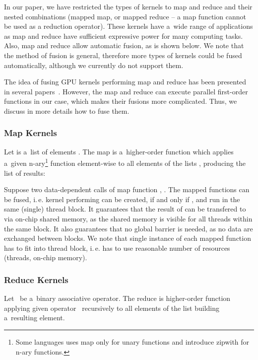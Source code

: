\documentclass[final]{siamltex}
\def\ie{i.\,e.}
\begin{document}
In our paper, we have restricted the types of kernels to map and reduce and their nested combinations (mapped map, or mapped reduce -- a map function cannot be used as a reduction operator). These kernels have a~wide range of applications as map and reduce have sufficient expressive power for many computing tasks. Also, map and reduce allow automatic fusion, as is shown below.
We note that the method of fusion is general, therefore more types of kernels could be fused automatically, although we currently do not support them. 

The idea of fusing GPU kernels performing map and reduce has been presented in several papers~\cite{sato2009skeletal, larsen2011simple, catanzaro2011copperhead, tarditi2006accelerator}. However, the map and reduce can execute parallel first-order functions in our case, which makes their fusions more complicated. Thus, we discuss in more details how to fuse them.

\subsubsection{Map Kernels}

Let  is a~list of  elements . The map is a~higher-order function which applies a~given n-ary\footnote{Some languages uses map only for unary functions and introduce zipwith for n-ary functions.} function  element-wise to all elements of the lists , producing the list of results:

\begin{center}
        
\end{center}

Suppose two data-dependent calls of map function , . The mapped functions  can be fused, \ie{} kernel performing  can be created, if and only if ,  and  run in the same (single) thread block. It guarantees that the result of  can be transfered to  via on-chip shared memory, as the shared memory is visible for all threads within the same block. It also guarantees that no global barrier is needed, as no data are exchanged between blocks.  We note that single instance of each mapped function has to fit into thread block, \ie{} has to use reasonable number of resources (threads, on-chip memory).

\subsubsection{Reduce Kernels}

Let~ be a~binary associative operator. The reduce is higher-order function applying given operator~ recursively to all elements of the list  building a~resulting element.
\end{document}
